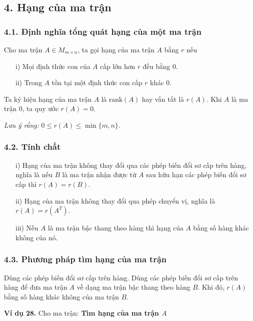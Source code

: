 \subsection*{4. Hạng của ma trận}

\subsubsection*{4.1. Định nghĩa tổng quát hạng của một ma trận}
Cho ma trận \(A \in M_{m \times n}\), ta gọi hạng của ma trận \(A\) bằng \(r\) nếu
\begin{itemize}
    \item[i)] Mọi định thức con của \(A\) cấp lớn hơn \(r\) đều bằng 0.
    \item[ii)] Trong \(A\) tồn tại một định thức con cấp \(r\) khác 0.
\end{itemize}

Ta ký hiệu hạng của ma trận \(A\) là \(\text{rank}(A)\) hay vắn tắt là \(r(A)\). Khi \(A\) là ma trận 0, ta quy ước \(r(A) = 0\).

\textit{Lưu ý rằng:} \(0 \le r(A) \le \min\{m,n\}\).

\subsubsection*{4.2. Tính chất}
\begin{itemize}
    \item[i)] Hạng của ma trận không thay đổi qua các phép biến đổi sơ cấp trên hàng, nghĩa là nếu \(B\) là ma trận nhận được từ \(A\) sau hữu hạn các phép biến đổi sơ cấp thì \(r(A) = r(B)\).
    \item[ii)] Hạng của ma trận không thay đổi qua phép chuyển vị, nghĩa là \(r(A) = r(A^T)\).
    \item[iii)] Nếu \(A\) là ma trận bậc thang theo hàng thì hạng của \(A\) bằng số hàng khác không của nó.
\end{itemize}

\subsubsection*{4.3. Phương pháp tìm hạng của ma trận}
Dùng các phép biến đổi sơ cấp trên hàng. Dùng các phép biến đổi sơ cấp trên hàng để đưa ma trận \(A\) về dạng ma trận bậc thang theo hàng \(B\). Khi đó, \(r(A)\) bằng số hàng khác không của ma trận \(B\).

\textbf{Ví dụ 28.} Cho ma trận:
\textbf{Tìm hạng của ma trận \( A \)}

